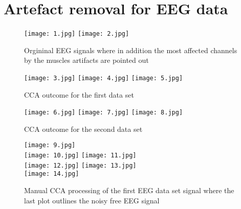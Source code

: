\section{Artefact removal for EEG data}




\begin{figure}[!htbp]
%
\centering
\texttt{[image: 1.jpg]}
\endminipage\hfill
{}%
\centering
\texttt{[image: 2.jpg]}
\endminipage\hfill
\caption{Orgininal EEG signals where in addition the most affected channels by the muscles artifacts are pointed out}
\end{figure}


\begin{figure}[!htbp]
%
\centering
\texttt{[image: 3.jpg]}
\endminipage\hfill
{}%
\centering
\texttt{[image: 4.jpg]}
\endminipage\hfill
{}%
\centering
\texttt{[image: 5.jpg]}
\endminipage\hfill
\caption{CCA outcome for the first data set}
\end{figure}

\begin{figure}[!htbp]
%
\centering
\texttt{[image: 6.jpg]}
\endminipage\hfill
{}%
\centering
\texttt{[image: 7.jpg]}
\endminipage\hfill
{}%
\centering
\texttt{[image: 8.jpg]}
\endminipage\hfill
\caption{CCA outcome for the second data set}
\end{figure}

\begin{figure}[!htbp]
%
\centering
\texttt{[image: 9.jpg]}\\
\texttt{[image: 10.jpg]}
\endminipage\hfill
{}%
\centering
\texttt{[image: 11.jpg]}\\
\texttt{[image: 12.jpg]}
\endminipage\hfill
{}%
\centering
\texttt{[image: 13.jpg]}\\
\texttt{[image: 14.jpg]}
\endminipage\hfill
\caption{Manual CCA processing of the first EEG data set signal where the last plot outlines the noisy free EEG signal}\label{today4}
\end{figure}


